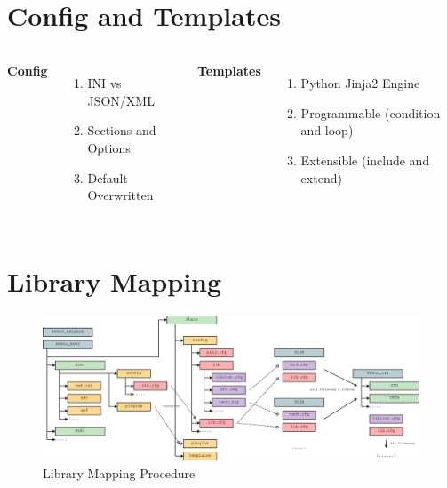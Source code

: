 \documentclass{beamer}
\begin{document}
\section{Config and Templates} %

\begin{frame}
  \begin{columns}[c] %

    \textbf{Config}
    \begin{enumerate}
    \item INI vs JSON/XML
    \item Sections and Options
    \item Default Overwritten
    \end{enumerate}

    \textbf{Templates}
    \begin{enumerate}
    \item Python Jinja2 Engine
    \item Programmable (condition and loop)
    \item Extensible (include and extend)
    \end{enumerate}

  \end{columns}
\end{frame}

\section{Library Mapping} %

\begin{frame}
  \begin{figure}
    \centering
    \includegraphics[width=1.10\linewidth]{lib_map_hier}
    \caption{Library Mapping Procedure}
  \end{figure}
\end{frame}
\end{document}
